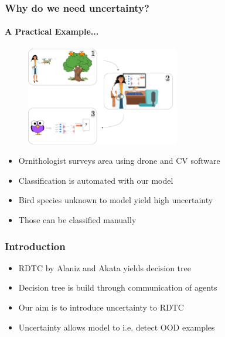 \documentclass[9pt]{beamer}
\begin{document}
\begin{frame}
\frametitle{Why do we need uncertainty?}
\framesubtitle{A Practical Example...}
	\begin{figure}
		\centering
		\includegraphics[width=0.6\textwidth]{images/ornithology.pdf}
	\end{figure}
	\begin{itemize}%
	\item Ornithologist surveys area using drone and CV software
	\item Classification is automated with our model
	\item Bird species unknown to model yield high uncertainty
	\item Those can be classified manually
	\end{itemize}
\end{frame}

\begin{frame}
\frametitle{Introduction}
\begin{itemize}
	\item RDTC by Alaniz and Akata \cite{alaniz2019explainable} yields decision tree
	\item Decision tree is build through communication of agents
	\item Our aim is to introduce uncertainty to RDTC
	\item Uncertainty allows model to i.e. detect OOD examples
\end{itemize}
\end{frame}
\end{document}
